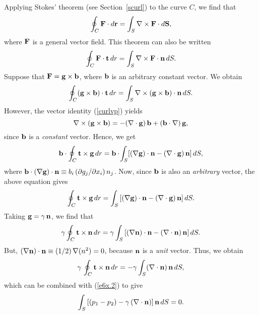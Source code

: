 Applying Stokes' theorem (see Section~\ref{scurl}) to the curve $C$, we find that
\begin{equation}
\oint_C {\bf F}\cdot d{\bf r} = \int_S \nabla\times {\bf F}\cdot d{\bf S},
\end{equation}
where ${\bf F}$ is a general vector field. This theorem can also be written
\begin{equation}
\oint_C {\bf F}\cdot {\bf t}\,dr= \int_S \nabla\times {\bf F}\cdot {\bf n}\,dS.
\end{equation}
Suppose that ${\bf F} = {\bf g}\times {\bf b}$, where ${\bf b}$ is an arbitrary constant vector. We obtain
\begin{equation}
\oint_C ({\bf g}\times {\bf b})\cdot {\bf t}\,dr= \int_S \nabla\times({\bf g}\times{\bf b})\cdot {\bf n}\,dS.
\end{equation}
However, the vector identity (\ref{curlvp}) yields
\begin{equation}
\nabla\times ({\bf g}\times {\bf b}) = - (\nabla\cdot{\bf g})\,{\bf b} + ({\bf b}\cdot\nabla)\,{\bf g},
\end{equation}
since ${\bf b}$ is a {\em constant}\/ vector.
Hence, we get
\begin{equation}
{\bf b}\cdot\oint_C {\bf t}\times {\bf g}\,dr = {\bf b}\cdot\!\int_S[(\nabla {\bf g})\cdot{\bf n} - (\nabla\cdot{\bf g})\,{\bf n}]\,dS,
\end{equation}
where ${\bf b} \cdot(\nabla {\bf g})\cdot{\bf n} \equiv b_i\,(\partial g_j/\partial x_i)\,n_j$. 
Now, since ${\bf b}$ is also an {\em arbitrary}\/ vector, the above equation gives
\begin{equation}
\oint_C {\bf t}\times {\bf g}\,dr = \int_S\left[(\nabla {\bf g})\cdot{\bf n} - (\nabla\cdot{\bf g})\,{\bf n}\right]dS.
\end{equation}
Taking  ${\bf g} = \gamma\,{\bf n}$, we find that
\begin{equation}
\gamma\oint_C {\bf t}\times {\bf n}\,dr= \gamma\int_S \left[(\nabla {\bf n})\cdot {\bf n} - (\nabla\cdot {\bf n})\,{\bf n}\right]dS.
\end{equation}
But, $(\nabla{\bf n})\cdot {\bf n}\equiv (1/2)\,\nabla(n^2)=0$, because ${\bf n}$ is a {\em unit}\/ vector. Thus, we obtain
\begin{equation}\label{e6x.10}
\gamma\,\oint_C {\bf t}\times{\bf n}\,dr = - \gamma\int_S (\nabla \cdot{\bf n})\,{\bf n}\,dS,
\end{equation}
which can be combined with (\ref{e6x.2}) to give
\begin{equation}
\int_S\left[(p_1-p_2)-\gamma\,(\nabla\cdot{\bf n})\right]{\bf n}\,dS = 0.
\end{equation}
